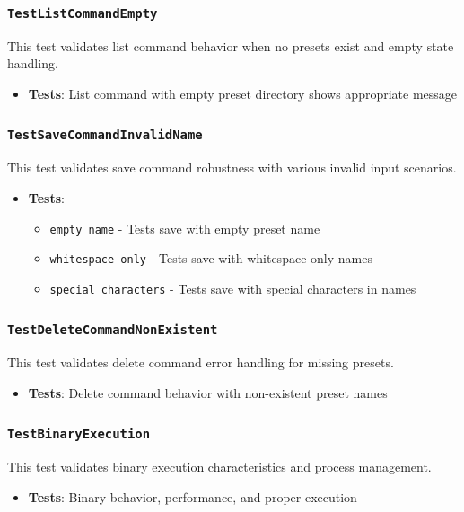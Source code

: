 \subsubsection*{\texttt{TestListCommandEmpty}}
This test validates list command behavior when no presets exist and empty state handling.
\begin{itemize}
    \item \textbf{Tests}: List command with empty preset directory shows appropriate message
\end{itemize}

\subsubsection*{\texttt{TestSaveCommandInvalidName}}
This test validates save command robustness with various invalid input scenarios.
\begin{itemize}
    \item \textbf{Tests}:
    \begin{itemize}
        \item \texttt{empty name} - Tests save with empty preset name
        \item \texttt{whitespace only} - Tests save with whitespace-only names
        \item \texttt{special characters} - Tests save with special characters in names
    \end{itemize}
\end{itemize}

\subsubsection*{\texttt{TestDeleteCommandNonExistent}}
This test validates delete command error handling for missing presets.
\begin{itemize}
    \item \textbf{Tests}: Delete command behavior with non-existent preset names
\end{itemize}

\subsubsection*{\texttt{TestBinaryExecution}}
This test validates binary execution characteristics and process management.
\begin{itemize}
    \item \textbf{Tests}: Binary behavior, performance, and proper execution
\end{itemize}